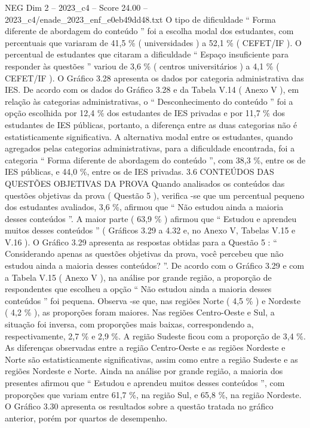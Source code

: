\begin{textsample}{NEG Dim 2 – 2023\_c4 – Score 24.00 – 2023\_c4/enade\_2023\_enf\_e0eb49dd48.txt}
O tipo de dificuldade “ Forma diferente de abordagem do conteúdo ” foi a escolha modal dos estudantes, com percentuais que variaram de 41,5 \% ( universidades ) a 52,1 \% ( CEFET/IF ).
O percentual de estudantes que citaram a dificuldade “ Espaço insuficiente para responder às questões ” variou de 3,6 \% ( centros universitários ) a 4,1 \% ( CEFET/IF ).
O Gráfico 3.28 apresenta os dados por categoria administrativa das IES.
De acordo com os dados do Gráfico 3.28 e da Tabela V.14 ( Anexo V ), em relação às categorias administrativas, o “ Desconhecimento do conteúdo ” foi a opção escolhida por 12,4 \% dos estudantes de IES privadas e por 11,7 \% dos estudantes de IES públicas, portanto, a diferença entre as duas categorias não é estatisticamente significativa.
A alternativa modal entre os estudantes, quando agregados pelas categorias administrativas, para a dificuldade encontrada, foi a categoria “ Forma diferente de abordagem do conteúdo ”, com 38,3 \%, entre os de IES públicas, e 44,0 \%, entre os de IES privadas. 3.6 CONTEÚDOS DAS QUESTÕES OBJETIVAS DA PROVA Quando analisados os conteúdos das questões objetivas da prova ( Questão 5 ), verifica -se que um percentual pequeno dos estudantes avaliados, 3,6 \%, afirmou que “ Não estudou ainda a maioria desses conteúdos ”.
A maior parte ( 63,9 \% ) afirmou que “ Estudou e aprendeu muitos desses conteúdos ” ( Gráficos 3.29 a 4.32 e, no Anexo V, Tabelas V.15 e V.16 ).
O Gráfico 3.29 apresenta as respostas obtidas para a Questão 5 : “ Considerando apenas as questões objetivas da prova, você percebeu que não estudou ainda a maioria desses conteúdos? ”.
De acordo com o Gráfico 3.29 e com a Tabela V.15 ( Anexo V ), na análise por grande região, a proporção de respondentes que escolheu a opção “ Não estudou ainda a maioria desses conteúdos ” foi pequena.
Observa -se que, nas regiões Norte ( 4,5 \% ) e Nordeste ( 4,2 \% ), as proporções foram maiores.
Nas regiões Centro-Oeste e Sul, a situação foi inversa, com proporções mais baixas, correspondendo a, respectivamente, 2,7 \% e 2,9 \%.
A região Sudeste ficou com a proporção de 3,4 \%.
As diferenças observadas entre a região Centro-Oeste e as regiões Nordeste e Norte são estatisticamente significativas, assim como entre a região Sudeste e as regiões Nordeste e Norte.
Ainda na análise por grande região, a maioria dos presentes afirmou que “ Estudou e aprendeu muitos desses conteúdos ”, com proporções que variam entre 61,7 \%, na região Sul, e 65,8 \%, na região Nordeste.
O Gráfico 3.30 apresenta os resultados sobre a questão tratada no gráfico anterior, porém por quartos de desempenho.

\end{textsample}

